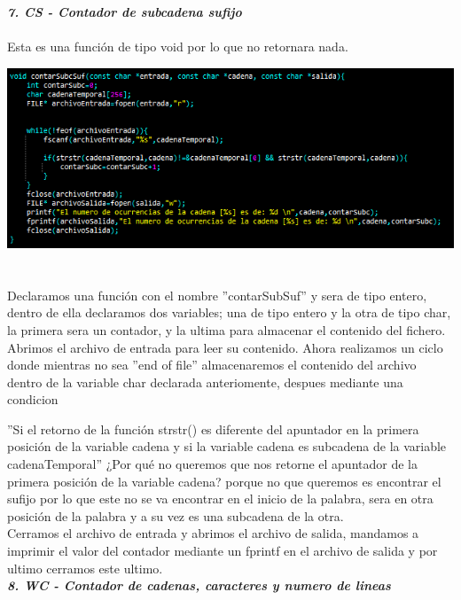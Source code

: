 \documentclass[12pt,letterpaper]{report}
\begin{document}
\textbf{\textit{ 7. CS - Contador de subcadena sufijo}}\\\\
Esta es una función de tipo void por lo que no retornara nada.
\begin{multicols}{2}
\includegraphics[scale=0.5]{punto7}\\\\
\\Declaramos una función con el nombre ''contarSubSuf'' y sera de tipo entero, dentro de ella declaramos dos variables; una de tipo entero y la otra de tipo char, la primera sera un contador, y la ultima para almacenar el contenido del fichero. Abrimos el archivo de entrada para leer su contenido. Ahora realizamos un ciclo donde mientras no sea ''end of file'' almacenaremos el contenido del archivo dentro de la variable char declarada anteriomente, despues mediante una condicion
\end{multicols}
''Si el retorno de la función strstr() es diferente del apuntador en la primera posición de la variable cadena y si la variable cadena es subcadena de la variable cadenaTemporal''
¿Por qué no queremos que nos retorne el apuntador de la primera posición de la variable cadena? porque no que queremos es encontrar el sufijo por lo que este no se va encontrar en el inicio de la palabra, sera en otra posición de la palabra y a su vez es una subcadena de la otra.\\ Cerramos el archivo de entrada y abrimos el archivo de salida, mandamos a imprimir el valor del contador mediante un fprintf en el archivo de salida y por ultimo cerramos este ultimo.\\

\textbf{\textit{ 8. WC - Contador de cadenas, caracteres y numero de lineas}}\\
\end{document}
